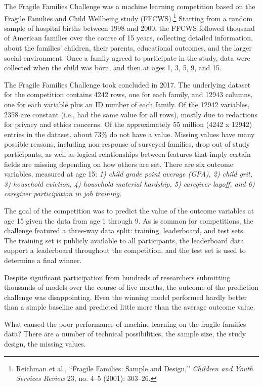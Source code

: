 \documentclass{tufte-book}
\begin{document}
The Fragile Families Challenge was a machine learning competition based
on the Fragile Families and Child Wellbeing study (FFCWS).\footnote{Reichman
  et al., {``Fragile Families: Sample and Design,''} \emph{Children and
  Youth Services Review} 23, no. 4--5 (2001): 303--26.} Starting from a
random sample of hospital births between 1998 and 2000, the FFCWS
followed thousand of American families over the course of 15 years,
collecting detailed information, about the families' children, their
parents, educational outcomes, and the larger social environment. Once a
family agreed to participate in the study, data were collected when the
child was born, and then at ages 1, 3, 5, 9, and
15.

The Fragile Families Challenge took concluded in 2017. The underlying
dataset for the competition contains 4242 rows, one for each family, and
12943 columns, one for each variable plus an ID number of each family.
Of the 12942 variables, 2358 are constant (i.e., had the same value for
all rows), mostly due to redactions for privacy and ethics concerns. Of
the approximately 55 million (4242 x 12942) entries in the dataset,
about 73\% do not have a value. Missing values have many possible
reasons, including non-response of surveyed families, drop out of study
participants, as well as logical relationships between features that
imply certain fields are missing depending on how others are set. There
are six outcome variables, measured at age 15: \emph{1) child grade
point average (GPA), 2) child grit, 3) household eviction, 4) household
material hardship, 5) caregiver layoff, and 6) caregiver participation
in job training.}

The goal of the competition was to predict the value of the outcome
variables at age 15 given the data from age 1 through 9. As is common
for competitions, the challenge featured a three-way data split:
training, leaderboard, and test sets. The training set is publicly
available to all participants, the leaderboard data support a
leaderboard throughout the competition, and the test set is used to
determine a final winner.

Despite significant participation from hundreds of researchers
submitting thousands of models over the course of five months, the
outcome of the prediction challenge was disappointing. Even the winning
model performed hardly better than a simple baseline and predicted
little more than the average outcome value.

What caused the poor performance of machine learning on the fragile
families data? There are a number of technical possibilities, the sample
size, the study design, the missing values.
\end{document}
